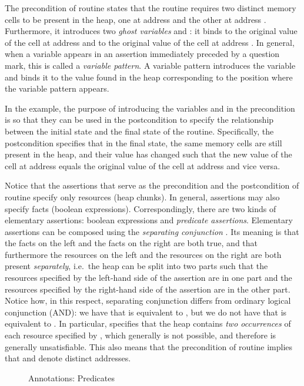\documentclass{CSML}
\theoremstyle{definition}\newtheorem{notation}[thm]{Notation}
\theoremstyle{plain}\newtheorem{satz}[thm]{Satz}
\begin{document}
The precondition of routine  states that the 
routine requires two distinct memory cells to be present in the 
heap, one at address  and the other at address 
. Furthermore, it introduces two \emph{ghost 
variables}  and : it binds 
 to the original value of the cell at address 
 and  to the original value of the 
cell at address . In general, when a variable 
appears in an assertion immediately preceded by a question 
mark, this is called a \emph{variable pattern}. A variable 
pattern  introduces the variable  and binds it to the 
value found in the heap corresponding to the position where the 
variable pattern appears.

In the example, the purpose of introducing the variables 
 and  in the precondition is so that 
they can be used in the postcondition to specify the 
relationship between the initial state and the final state of 
the routine. Specifically, the postcondition specifies that in 
the final state, the same memory cells are still present in the 
heap, and their value has changed such that the new value of 
the cell at address  equals the original value 
of the cell at address  and vice versa.

Notice that the assertions that serve as the precondition and 
the postcondition of routine  specify only resources (heap 
chunks). In general, assertions may also specify facts (boolean expressions).
Correspondingly, there are two kinds of elementary 
assertions: boolean expressions and \emph{predicate 
assertions}. Elementary assertions can be composed using the 
\emph{separating conjunction} . Its meaning is that the 
facts on the left and the facts on the right are both true, and 
that furthermore the resources on the left and the resources on 
the right are both present \emph{separately}, i.e.~the heap can 
be split into two parts such that the resources specified by 
the left-hand side of the assertion are in one part and the 
resources specified by the right-hand side of the assertion are 
in the other part. Notice how, in this respect, separating 
conjunction differs from ordinary logical conjunction (AND): we 
have that  is equivalent to , but we do not have 
that  is equivalent to . In particular,  
specifies that the heap contains \emph{two occurrences} of each 
resource specified by , which generally is not possible, and 
therefore  is generally unsatisfiable. This also means 
that the precondition of routine  implies that 
 and  denote distinct addresses. 

\begin{figure}

\caption{Annotations: Predicates}\label{fig:ex-preds}
\end{figure}
\end{document}
